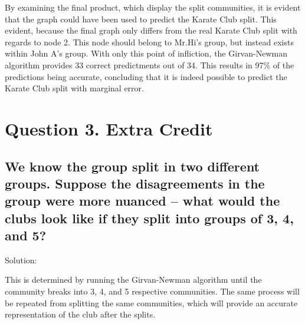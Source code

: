 \documentclass[11pt]{article} %
\begin{document}
\pagebreak

\tabto{2.0cm} By examining the final product, which display the split communities, it is evident that the graph could have been used to predict the Karate Club split. This evident, because the final graph only differs from the real Karate Club split with regards to node 2. This node should belong to Mr.Hi's group, but instead exists within John A's group. With only this point of infliction, the Girvan-Newman algorithm provides 33 correct predictments out of 34. This results in 97\% of the predictions being accurate, concluding that it is indeed possible to predict the Karate Club split with marginal error.

\clearpage
\section*{Question 3. Extra Credit}


\subsection*{We know the group split in two different groups.  Suppose the
disagreements in the group were more nuanced -- what would the clubs
look like if they split into groups of 3, 4, and 5?}
\bigskip\bigskip


\Large Solution:
\newline \newline\small

\tabto{2.0cm} This is determined by running the Girvan-Newman algorithm until the community breaks into 3, 4, and 5 respective communities. The same process will be repeated from splitting the same communities, which will provide an accurate representation of the club after the splits.
\end{document}
